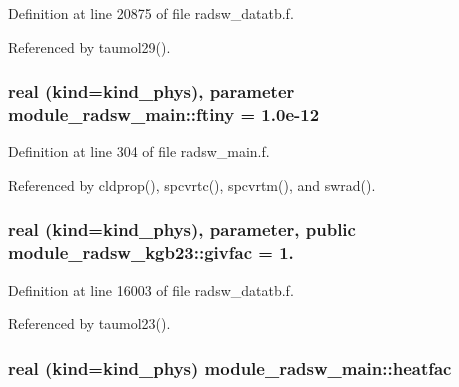 Definition at line 20875 of file radsw\+\_\+datatb.\+f.



Referenced by taumol29().

\subsubsection[{\texorpdfstring{ftiny}{ftiny}}]{\setlength{\rightskip}{0pt plus 5cm}real (kind=kind\+\_\+phys), parameter module\+\_\+radsw\+\_\+main\+::ftiny = 1.\+0e-\/12\hspace{0.3cm}{\ttfamily [private]}}\hypertarget{group__module__radsw__main_gabe91ed52b6016e99a2d0c874524fb27f}{}\label{group__module__radsw__main_gabe91ed52b6016e99a2d0c874524fb27f}


Definition at line 304 of file radsw\+\_\+main.\+f.



Referenced by cldprop(), spcvrtc(), spcvrtm(), and swrad().

\subsubsection[{\texorpdfstring{givfac}{givfac}}]{\setlength{\rightskip}{0pt plus 5cm}real (kind=kind\+\_\+phys), parameter, public module\+\_\+radsw\+\_\+kgb23\+::givfac = 1.}\hypertarget{group__module__radsw__main_ga5f6ced06169db4b7470e20d5639ac54c}{}\label{group__module__radsw__main_ga5f6ced06169db4b7470e20d5639ac54c}


Definition at line 16003 of file radsw\+\_\+datatb.\+f.



Referenced by taumol23().

\subsubsection[{\texorpdfstring{heatfac}{heatfac}}]{\setlength{\rightskip}{0pt plus 5cm}real (kind=kind\+\_\+phys) module\+\_\+radsw\+\_\+main\+::heatfac\hspace{0.3cm}{\ttfamily [private]}}\hypertarget{group__module__radsw__main_gaad60e753cdda20d4e84d063280f0dfcc}{}\label{group__module__radsw__main_gaad60e753cdda20d4e84d063280f0dfcc}


